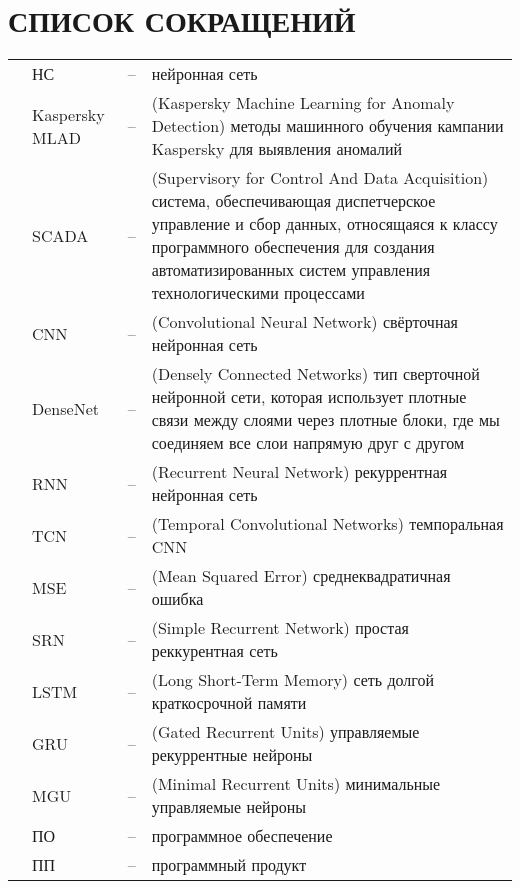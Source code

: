 \sectionbreak \section*{ 
    \gostTitleFont
    \redline
    СПИСОК СОКРАЩЕНИЙ
}
\titlespace

{\gostFont

\begin{tabular}{p{0.85cm} p{1.75cm} p{0.3cm} p{132.5mm}}
    & НС & {--} & нейронная сеть \\
    & Kaspersky MLAD & {--} & (Kaspersky Machine Learning for Anomaly Detection) методы машинного обучения кампании Kaspersky для выявления аномалий \\
    & SCADA & {--} & (Supervisory for Control And Data Acquisition) система, обеспечивающая диспетчерское управление и сбор данных, относящаяся к классу программного обеспечения для создания автоматизированных систем управления технологическими процессами \\
    & CNN & {--} & (Convolutional Neural Network) свёрточная нейронная сеть \\
    & DenseNet & {--} & (Densely Connected Networks) тип сверточной нейронной сети, которая использует плотные связи между слоями через плотные блоки, где мы соединяем все слои напрямую друг с другом \\
    & RNN & {--} & (Recurrent Neural Network) рекуррентная нейронная сеть \\
    & TCN & {--} & (Temporal Convolutional Networks) темпоральная CNN \\
    & MSE & {--} & (Mean Squared Error) среднеквадратичная ошибка \\
    & SRN & {--} & (Simple Recurrent Network) простая реккурентная сеть \\
    & LSTM & {--} & (Long Short-Term Memory) сеть долгой краткосрочной памяти \\
    & GRU & {--} & (Gated Recurrent Units) управляемые рекуррентные нейроны \\
    & MGU & {--} & (Minimal Recurrent Units) минимальные управляемые нейроны \\
    & ПО & {--} & программное обеспечение \\
    & ПП & {--} & программный продукт \\
\end{tabular}

}
